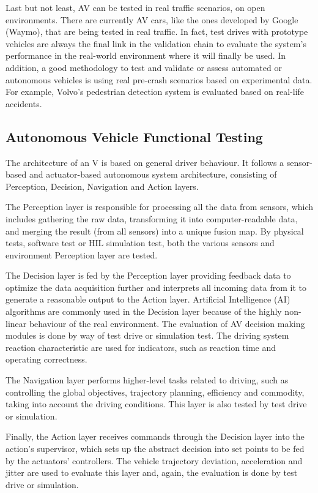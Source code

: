 \documentclass[a4paper, 10pt]{article}
\begin{document}
Last but not least, AV can be tested in real traffic scenarios, on open environments. There are currently AV cars, like the ones developed by Google (Waymo), that are being tested in real traffic. In fact, test drives with prototype vehicles are always the final
link in the validation chain to evaluate the system's performance in the real-world environment where it will finally be used. In addition, a good methodology to test and validate or assess automated or autonomous vehicles is using real pre-crash scenarios based on experimental data. For example, Volvo's pedestrian detection system is evaluated based on real-life accidents.

\subsection{Autonomous Vehicle Functional Testing}
The architecture of an V is based on general driver behaviour. It follows a sensor-based and actuator-based autonomous system architecture, consisting of Perception, Decision, Navigation and Action layers. 

The Perception layer is responsible for processing all the data from sensors, which includes gathering the raw data, transforming it into computer-readable data, and merging the result (from all sensors) into a unique fusion map. By physical tests, software test or HIL simulation test, both the various sensors and environment Perception layer are tested. 

The Decision layer is fed by the Perception layer providing feedback data to optimize the data acquisition further and interprets all incoming data from it to generate a reasonable output to the Action layer. Artificial Intelligence (AI) algorithms are commonly used in the Decision layer because of the highly non-linear behaviour of the real environment. The evaluation of AV decision making modules is done by way of test drive or simulation test. The driving system reaction characteristic are used for indicators, such as reaction time and operating correctness.


The Navigation layer performs higher-level tasks related to driving, such as controlling the global objectives, trajectory planning, efficiency and commodity, taking into account the driving conditions. This layer is also tested by test drive or simulation.

Finally, the Action layer receives commands through the Decision layer into the action's supervisor, which sets up the abstract decision into set points to be fed by the actuators' controllers. The vehicle trajectory deviation, acceleration and jitter are used to evaluate this layer and, again, the evaluation is done by test drive or simulation.	
\end{document}
